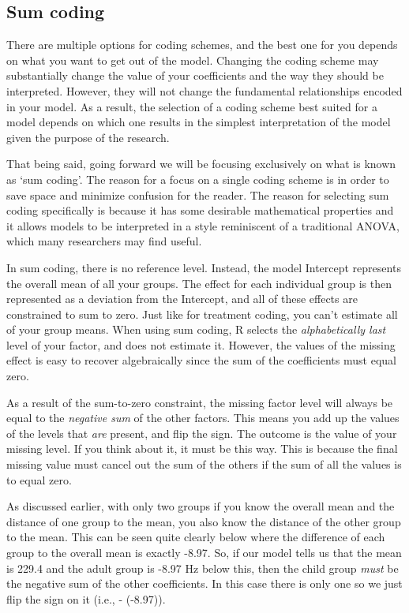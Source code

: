 \documentclass[
]{book}
\begin{document}
\hypertarget{sum-coding}{%
\subsection{Sum coding}\label{sum-coding}}

There are multiple options for coding schemes, and the best one for you depends on what you want to get out of the model. Changing the coding scheme may substantially change the value of your coefficients and the way they should be interpreted. However, they will not change the fundamental relationships encoded in your model. As a result, the selection of a coding scheme best suited for a model depends on which one results in the simplest interpretation of the model given the purpose of the research.

That being said, going forward we will be focusing exclusively on what is known as `sum coding'. The reason for a focus on a single coding scheme is in order to save space and minimize confusion for the reader. The reason for selecting sum coding specifically is because it has some desirable mathematical properties and it allows models to be interpreted in a style reminiscent of a traditional ANOVA, which many researchers may find useful.

In sum coding, there is no reference level. Instead, the model Intercept represents the overall mean of all your groups. The effect for each individual group is then represented as a deviation from the Intercept, and all of these effects are constrained to sum to zero. Just like for treatment coding, you can't estimate all of your group means. When using sum coding, R selects the \emph{alphabetically last} level of your factor, and does not estimate it. However, the values of the missing effect is easy to recover algebraically since the sum of the coefficients must equal zero.

As a result of the sum-to-zero constraint, the missing factor level will always be equal to the \emph{negative sum} of the other factors. This means you add up the values of the levels that \emph{are} present, and flip the sign. The outcome is the value of your missing level. If you think about it, it must be this way. This is because the final missing value must cancel out the sum of the others if the sum of all the values is to equal zero.

As discussed earlier, with only two groups if you know the overall mean and the distance of one group to the mean, you also know the distance of the other group to the mean. This can be seen quite clearly below where the difference of each group to the overall mean is exactly -8.97. So, if our model tells us that the mean is 229.4 and the adult group is -8.97 Hz below this, then the child group \emph{must} be the negative sum of the other coefficients. In this case there is only one so we just flip the sign on it (i.e., - (-8.97)).
\end{document}

